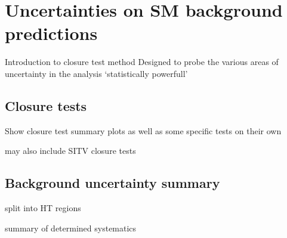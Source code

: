 \section{Uncertainties on SM background predictions}  %
\label{sec:background_systematics}

Introduction to closure test method
Designed to probe the various areas of uncertainty in the analysis
`statistically powerfull'

\subsection{Closure tests}
Show closure test summary plots as well as some specific tests on their own

may also include SITV closure tests

\subsection{Background uncertainty summary}
split into HT regions

summary of determined systematics